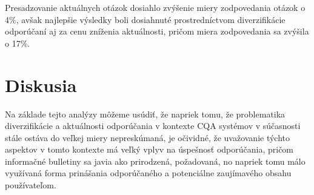 Presadzovanie aktuálnych otázok dosiahlo zvýšenie miery zodpovedania otázok o 4\%, avšak najlepšie výsledky boli dosiahnuté
prostredníctvom diverzifikácie odporúčaní aj za cenu zníženia aktuálnosti, pričom miera zodpovedania sa zvýšila o 17\%.

\section{Diskusia}

Na základe tejto analýzy môžeme usúdiť, že napriek tomu, že problematika diverzifikácie a aktuálnosti odporúčania v kontexte
CQA systémov v súčasnosti stále ostáva do veľkej miery nepreskúmaná, je očividné, že uvažovanie týchto aspektov v tomto
kontexte má veľký vplyv na úspešnosť odporúčania, pričom informačné bulletiny sa javia ako prirodzená, požadovaná,
no napriek tomu málo využívaná forma prinášania odporúčaného a potenciálne zaujímavého obsahu používateľom.
